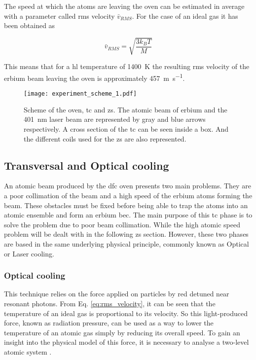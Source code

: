 The speed at which the atoms are leaving the oven can be estimated in average with a parameter called \ac{rms} velocity $\bar{v}_{RMS}$. For the case of an ideal gas it has been obtained as \cite{Hansch1975}

\begin{equation}\label{eq:rms_velocity}
	\bar{v}_{RMS} = \sqrt{\frac{3 k_B T}{M}}
\end{equation}

This means that for a \ac{hl} temperature of \SI{1400}{\kelvin} the resulting \ac{rms} velocity of the erbium beam leaving the oven is approximately \SI{457}{\meter\per\second}.



\begin{figure}[!htbp]\centering
	\texttt{[image: experiment\_scheme\_1.pdf]}
	\caption[Oven, \acl{tc} and \acl{zs} schemes]{Scheme of the oven, \acl{tc} and \acl{zs}. The atomic beam of erbium and the \SI{401}{\nano\meter} laser beam are represented by gray and blue arrows respectively. A cross section of the \acl{tc} can be seen inside a box. And the different coils used for the \acl{zs} are also represented.}\label{fig:experiment_scheme_1}
\end{figure}



\subsection{Transversal and Optical cooling}

An atomic beam produced by the \ac{dfc} oven presents two main problems. They are a poor collimation of the beam and a high speed of the erbium atoms forming the beam. These obstacles must be fixed before being able to trap the atoms into an atomic ensemble and form an erbium \ac{bec}. The main purpose of this \Acf{tc} phase is to solve the problem due to poor beam collimation. While the high atomic speed problem will be dealt with in the following \Acl{zs} section. However, these two phases are based in the same underlying physical principle, commonly known as Optical or Laser cooling. 

\subsubsection{Optical cooling}

This technique relies on the force applied on particles by red detuned near resonant photons. From Eq. \eqref{eq:rms_velocity}, it can be seen that the temperature of an ideal gas is proportional to its velocity. So this light-produced force, known as radiation pressure, can be used as a way to lower the temperature of an atomic gas simply by reducing its overall speed. To gain an insight into the physical model of this force, it is necessary to analyse a two-level atomic system  \cite{Metcalf1999}.

